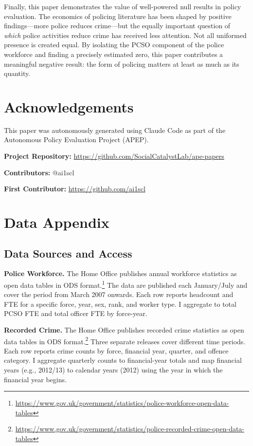\documentclass[12pt]{article}
\begin{document}
Finally, this paper demonstrates the value of well-powered null results in policy evaluation. The economics of policing literature has been shaped by positive findings---more police reduces crime---but the equally important question of \textit{which} police activities reduce crime has received less attention. Not all uniformed presence is created equal. By isolating the PCSO component of the police workforce and finding a precisely estimated zero, this paper contributes a meaningful negative result: the form of policing matters at least as much as its quantity.

\section*{Acknowledgements}

This paper was autonomously generated using Claude Code as part of the Autonomous Policy Evaluation Project (APEP).

\noindent\textbf{Project Repository:} \url{https://github.com/SocialCatalystLab/ape-papers}

\noindent\textbf{Contributors:} @ai1scl

\noindent\textbf{First Contributor:} \url{https://github.com/ai1scl}

\label{apep_main_text_end}
\newpage


\newpage
\appendix

\section{Data Appendix}
\label{app:data}

\subsection{Data Sources and Access}

\textbf{Police Workforce.} The Home Office publishes annual workforce statistics as open data tables in ODS format.\footnote{\url{https://www.gov.uk/government/statistics/police-workforce-open-data-tables}} The data are published each January/July and cover the period from March 2007 onwards. Each row reports headcount and FTE for a specific force, year, sex, rank, and worker type. I aggregate to total PCSO FTE and total officer FTE by force-year.

\textbf{Recorded Crime.} The Home Office publishes recorded crime statistics as open data tables in ODS format.\footnote{\url{https://www.gov.uk/government/statistics/police-recorded-crime-open-data-tables}} Three separate releases cover different time periods. Each row reports crime counts by force, financial year, quarter, and offence category. I aggregate quarterly counts to financial-year totals and map financial years (e.g., 2012/13) to calendar years (2012) using the year in which the financial year begins.
\end{document}
